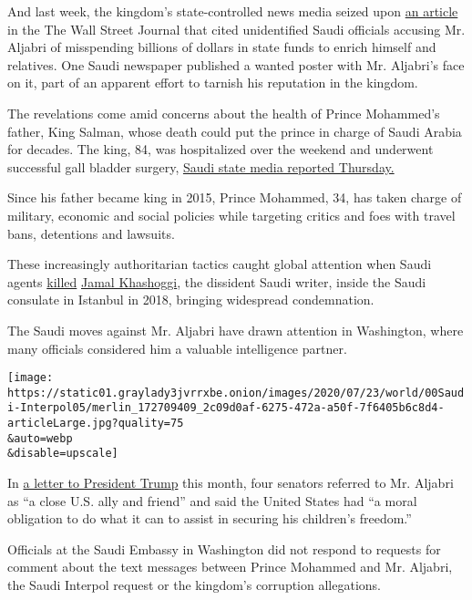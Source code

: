 And last week, the kingdom's state-controlled news media seized upon
\href{https://www.wsj.com/articles/a-spymaster-ran-off-after-saudis-say-billions-went-missing-they-want-him-back-11595004443}{an
article} in the The Wall Street Journal that cited unidentified Saudi
officials accusing Mr. Aljabri of misspending billions of dollars in
state funds to enrich himself and relatives. One Saudi newspaper
published a wanted poster with Mr. Aljabri's face on it, part of an
apparent effort to tarnish his reputation in the kingdom.

The revelations come amid concerns about the health of Prince Mohammed's
father, King Salman, whose death could put the prince in charge of Saudi
Arabia for decades. The king, 84, was hospitalized over the weekend and
underwent successful gall bladder surgery,
\href{https://english.alarabiya.net/en/News/gulf/2020/07/23/Saudi-Arabia-s-King-Salman-undergoes-successful-gallbladder-surgery-SPA.html}{Saudi
state media reported Thursday.}

Since his father became king in 2015, Prince Mohammed, 34, has taken
charge of military, economic and social policies while targeting critics
and foes with travel bans, detentions and lawsuits.

These increasingly authoritarian tactics caught global attention when
Saudi agents
\href{https://www.nytimes3xbfgragh.onion/video/world/middleeast/100000006154117/khashoggi-istanbul-death-saudi-consulate.html}{killed}
\href{https://www.nytimes3xbfgragh.onion/2018/10/14/world/middleeast/jamal-khashoggi-saudi-arabia.html}{Jamal
Khashoggi}, the dissident Saudi writer, inside the Saudi consulate in
Istanbul in 2018, bringing widespread condemnation.

The Saudi moves against Mr. Aljabri have drawn attention in Washington,
where many officials considered him a valuable intelligence partner.

\texttt{[image: https://static01.graylady3jvrrxbe.onion/images/2020/07/23/world/00Saudi-Interpol05/merlin\_172709409\_2c09d0af-6275-472a-a50f-7f6405b6c8d4-articleLarge.jpg?quality=75\\\&auto=webp\\\&disable=upscale]}

In \href{https://twitter.com/SenatorLeahy/status/1281281725499408386}{a
letter to President Trump} this month, four senators referred to Mr.
Aljabri as ``a close U.S. ally and friend'' and said the United States
had ``a moral obligation to do what it can to assist in securing his
children's freedom.''

Officials at the Saudi Embassy in Washington did not respond to requests
for comment about the text messages between Prince Mohammed and Mr.
Aljabri, the Saudi Interpol request or the kingdom's corruption
allegations.

